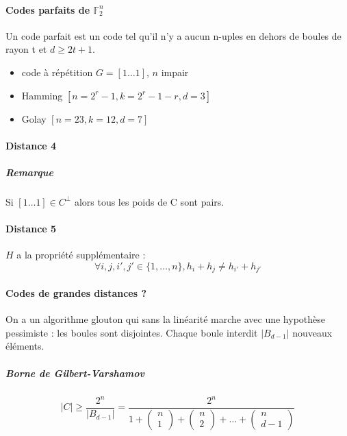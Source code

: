 \documentclass[12pt,a4paper]{report}
\begin{document}
\paragraph{Codes parfaits de $\mathbb{F}_2^n$\\}
Un code parfait est un code tel qu'il n'y a aucun n-uples en dehors de boules de rayon t et $d\geqslant 2t+1$.
\begin{itemize}
\item code à répétition $G=[1\ldots 1]$, $n$ impair
\item Hamming $[n=2^r-1,k=2^r-1-r,d=3]$
\item Golay $[n=23,k=12,d=7]$
\end{itemize}
\paragraph{Distance 4}
\subparagraph{Remarque\\}
Si $[1\ldots 1] \in C^{\bot}$ alors tous les poids de C sont pairs.
\paragraph{Distance 5\\}
$H$ a la propriété supplémentaire : 
$$ \forall i,j,i',j' \in \{1,\ldots,n\}, h_i+h_j \neq h_{i'}+h_{j'} $$
\paragraph{Codes de grandes distances ? \\}
On a un algorithme glouton qui sans la linéarité marche avec une hypothèse pessimiste : les boules sont disjointes. Chaque boule interdit $|B_{d-1}|$ nouveaux éléments.
\subparagraph{Borne de Gilbert-Varshamov\\}
$$ |C| \geqslant \frac{2^n}{|B_{d-1}|} = \frac{2^n}{1+\left(\begin{array}{c} n \\ 1 \end{array}\right)+\left(\begin{array}{l} n \\ 2 \end{array}\right)+ \ldots + \left(\begin{array}{c} n \\ d-1 \end{array}\right)} $$
\end{document}

